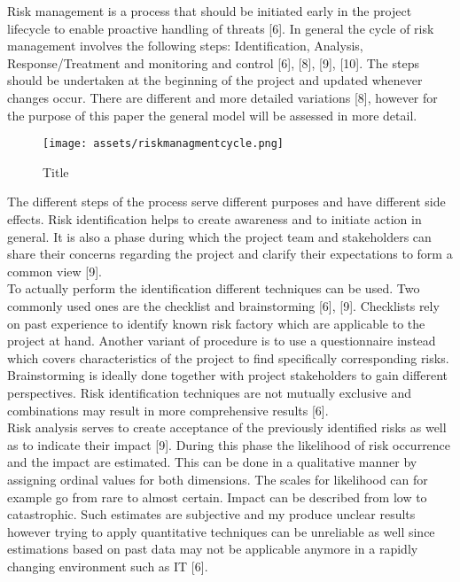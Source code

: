 Risk management is a process that should be initiated early in the project lifecycle to enable proactive handling of threats [6]. In general the cycle of risk management involves the following steps: Identification, Analysis, Response/Treatment and monitoring and control [6], [8], [9], [10]. The steps should be undertaken at the beginning of the project and updated whenever changes occur. There are different and more detailed variations [8], however for the purpose of this paper the general model will be assessed in more detail. \\
\begin{figure}[htbp] 
	\centering
	\texttt{[image: assets/riskmanagmentcycle.png]}
	\caption{Title}
	\cite{bibkey}
	\label{fig:label01}
\end{figure}
The different steps of the process serve different purposes and have different side effects. Risk identification helps to create awareness and to initiate action in general. It is also a phase during which the project team and stakeholders can share their concerns regarding the project and clarify their expectations to form a common view [9].\\

To actually perform the identification different techniques can be used. Two commonly used ones are the checklist and brainstorming [6], [9]. Checklists rely on past experience to identify known risk factory which are applicable to the project at hand. Another variant of procedure is to use a questionnaire instead which covers characteristics of the project to find specifically corresponding risks. Brainstorming is ideally done together with project stakeholders to gain different perspectives. Risk identification techniques are not mutually exclusive and combinations may result in more comprehensive results [6].\\

Risk analysis serves to create acceptance of the previously identified risks as well as to indicate their impact [9]. During this phase the likelihood of risk occurrence and the impact are estimated. This can be done in a qualitative manner by assigning ordinal values for both dimensions. The scales for likelihood can for example go from rare to almost certain. Impact can be described from low to catastrophic. Such estimates are subjective and my produce unclear results however trying to apply quantitative techniques can be unreliable as well since estimations based on past data may not be applicable anymore in a rapidly changing environment such as IT [6].\\

